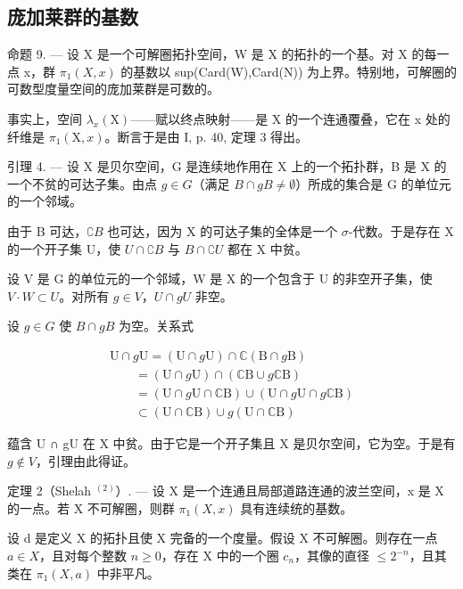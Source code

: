 \subsection{庞加莱群的基数}

命题 9. --- 设 X 是一个可解圈拓扑空间，W 是 X 的拓扑的一个基。对 X 的每一点 x，群 \(\pi_{1}(X,x)\) 的基数以 sup(Card(W),Card(N)) 为上界。特别地，可解圈的可数型度量空间的庞加莱群是可数的。

事实上，空间 \(\lambda_{x}(\mathrm{X})\)——赋以终点映射——是 X 的一个连通覆叠，它在 x 处的纤维是 \(\pi_{1}(\mathrm{X}, x)\)。断言于是由 I, p. 40, 定理 3 得出。

引理 4. --- 设 X 是贝尔空间，G 是连续地作用在 X 上的一个拓扑群，B 是 X 的一个不贫的可达子集。由点 \(g \in G\)（满足 \(B \cap gB \neq \emptyset\)）所成的集合是 G 的单位元的一个邻域。

由于 B 可达，\(\complement B\) 也可达，因为 X 的可达子集的全体是一个 \(\sigma\)-代数。于是存在 X 的一个开子集 U，使 \(U \cap \complement B\) 与 \(B \cap \complement U\) 都在 X 中贫。

设 V 是 G 的单位元的一个邻域，W 是 X 的一个包含于 U 的非空开子集，使 \(V \cdot W \subset U\)。对所有 \(g \in V\)，\(U \cap gU\) 非空。

设 \(g \in G\) 使 \(B \cap gB\) 为空。关系式

\[
\begin{array}{l} \mathrm{U} \cap g \mathrm{U} = (\mathrm{U} \cap g \mathrm{U}) \cap \mathbb {C} (\mathrm{B} \cap g \mathrm{B}) \\ \qquad = (\mathrm{U} \cap g \mathrm{U}) \cap (\mathbb {C} \mathrm{B} \cup g \mathbb {C} \mathrm{B}) \\ \qquad = (\mathrm{U} \cap g \mathrm{U} \cap \mathbb {C} \mathrm{B}) \cup (\mathrm{U} \cap g \mathrm{U} \cap g \mathbb {C} \mathrm{B}) \\ \qquad \subset (\mathrm{U} \cap \mathbb {C} \mathrm{B}) \cup g (\mathrm{U} \cap \mathbb {C} \mathrm{B}) \end{array}
\]

蕴含 U ∩ gU 在 X 中贫。由于它是一个开子集且 X 是贝尔空间，它为空。于是有 \(g \notin V\)，引理由此得证。

定理 2（Shelah \(^{(2)}\)）. --- 设 X 是一个连通且局部道路连通的波兰空间，x 是 X 的一点。若 X 不可解圈，则群 \(\pi_{1}(X,x)\) 具有连续统的基数。

设 d 是定义 X 的拓扑且使 X 完备的一个度量。假设 X 不可解圈。则存在一点 \(a \in X\)，且对每个整数 \(n \geqslant 0\)，存在 X 中的一个圈 \(c_{n}\)，其像的直径 \(\leqslant 2^{-n}\)，且其类在 \(\pi_{1}(X, a)\) 中非平凡。

